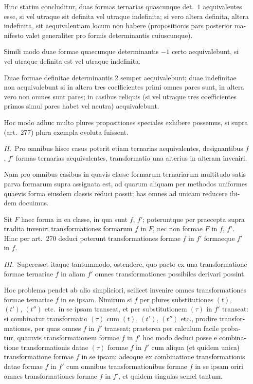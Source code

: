 \documentclass[12pt,a4paper]{article}
\theoremstyle{plain}
\theoremstyle{definition}
\theoremstyle{remark}
\begin{document}
\begin{otherlanguage}{latin}
Hinc statim concluditur, duas formas ternarias quascunque det.\ $1$ aequivalentes esse, si vel utraque sit definita vel utraque indefinita; si vero altera definita, altera indefinita, sit aequivalentiam locum non habere (propositionis pars posterior manifesto valet generaliter pro formis determinantis cuiuscunque).

Simili modo duae formae quaecunque determinantis $-1$ certo aequivalebunt, si vel utraque definita est vel utraque indefinita.

Duae formae definitae determinantis $2$ semper aequivalebunt; duae indefinitae non aequivalebunt si in altera tres coefficientes primi omnes pares sunt, in altera vero non omnes sunt pares; in casibus reliquis (si vel utraque tres coefficientes primos simul pares habet vel neutra) aequivalebunt.

Hoc modo adhuc multo plures propositiones speciales exhibere possemus, si supra (art.\ 277) plura exempla evoluta fuissent.

\textit{II.}\ Pro omnibus hisce casus poterit etiam ternarias aequivalentes, designantibus $f$, $f'$ formas ternarias aequivalentes, transformatio una alterius in alteram inveniri.

Nam pro omnibus casibus in quavis classe formarum ternariarum multitudo satis parva formarum supra assignata est, ad quarum aliquam per methodos uniformes quaevis forma eiusdem classis reduci possit; has omnes ad unicam reducere ibidem docuimus.

Sit $F$ haec forma in ea classe, in qua sunt $f$, $f'$; poteruntque per praecepta supra tradita inveniri transformationes formarum $f$ in $F$, nec non formae $F$ in $f$, $f'$. Hinc per art.\ 270 deduci poterunt transformationes formae $f$ in $f'$ formaeque $f'$ in $f$.

\textit{III.}\ Superesset itaque tantummodo, ostendere, quo pacto ex una transformatione formae ternariae $f$ in aliam $f'$ omnes transformationes possibiles derivari possint.

Hoc problema pendet ab alio simpliciori, scilicet invenire omnes transformationes formae ternariae $f$ in se ipsam. Nimirum si $f$ per plures substitutiones $(t)$, $(t')$, $(t'')$ etc.\ in se ipsam transeat, et per substitutionem $(\tau)$ in $f'$ transeat: si combinatur transformatio $(\tau)$ cum $(t)$, $(t')$, $(t'')$ etc., prodire transformationes, per quas omnes $f$ in $f'$ transeat; praeterea per calculum facile probatur, quamvis transformationem formae $f$ in $f'$ hoc modo deduci posse e combinatione transformationis datae $(\tau)$ formae $f$ in $f'$ cum aliqua (et quidem unica) transformatione formae $f$ in se ipsam: adeoque ex combinatione transformationis datae formae $f$ in $f'$ cum omnibus transformationibus formae $f$ in se ipsam oriri omnes transformationes formae $f$ in $f'$, et quidem singulas semel tantum.


\end{otherlanguage}
\end{document}
